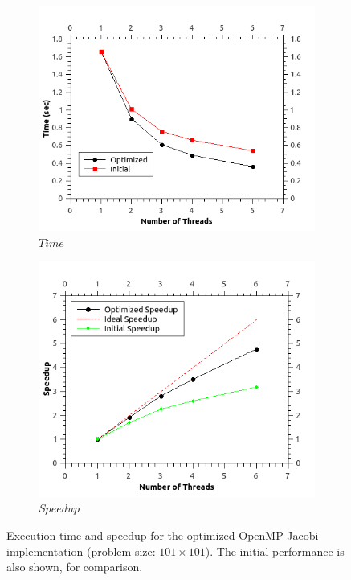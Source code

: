 \documentclass[11pt]{report}
\begin{document}
\begin{figure}[h!]
\centering
\begin{subfigure}{0.45\textwidth}
  \centering
  \includegraphics[width=1.0\linewidth]{images/jacobi_time_101_opt}
  \caption{$Time$}
\end{subfigure}
\begin{subfigure}{0.45\textwidth}
  \centering
  \includegraphics[width=1.0\linewidth]{images/jacobi_speedup_101_opt}
  \caption{$Speedup$}
\end{subfigure}
\caption{Execution time and speedup for the optimized OpenMP Jacobi implementation (problem size: $101 \times 101$). The initial performance is also shown, for comparison. }
\label{fig:example5.3}
\end{figure}
\end{document}
